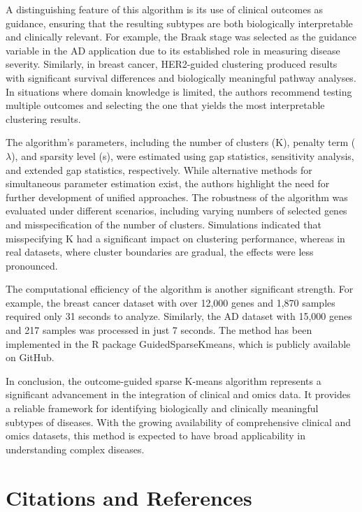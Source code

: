 \documentclass{statsoc}
\begin{document}
A distinguishing feature of this algorithm is its use of clinical outcomes as guidance, ensuring that the resulting subtypes are both biologically interpretable and clinically relevant. For example, the Braak stage was selected as the guidance variable in the AD application due to its established role in measuring disease severity. Similarly, in breast cancer, HER2-guided clustering produced results with significant survival differences and biologically meaningful pathway analyses. In situations where domain knowledge is limited, the authors recommend testing multiple outcomes and selecting the one that yields the most interpretable clustering results. 

The algorithm’s parameters, including the number of clusters (K), penalty term ($\lambda$), and sparsity level (s), were estimated using gap statistics, sensitivity analysis, and extended gap statistics, respectively. While alternative methods for simultaneous parameter estimation exist, the authors highlight the need for further development of unified approaches. The robustness of the algorithm was evaluated under different scenarios, including varying numbers of selected genes and misspecification of the number of clusters. Simulations indicated that misspecifying K had a significant impact on clustering performance, whereas in real datasets, where cluster boundaries are gradual, the effects were less pronounced.

The computational efficiency of the algorithm is another significant strength. For example, the breast cancer dataset with over 12,000 genes and 1,870 samples required only 31 seconds to analyze. Similarly, the AD dataset with 15,000 genes and 217 samples was processed in just 7 seconds. The method has been implemented in the R package GuidedSparseKmeans, which is publicly available on GitHub.

In conclusion, the outcome-guided sparse K-means algorithm represents a significant advancement in the integration of clinical and omics data. It provides a reliable framework for identifying biologically and clinically meaningful subtypes of diseases. With the growing availability of comprehensive clinical and omics datasets, this method is expected to have broad applicability in understanding complex diseases.

\section{Citations and References}


\end{document}
